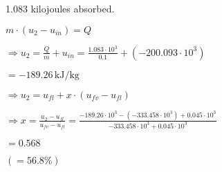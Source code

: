 1.083 kilojoules absorbed.  

\( m \cdot (u_2 - u_{in}) = Q \)  

\( \Rightarrow u_2 = \frac{Q}{m} + u_{in} = \frac{1.083 \cdot 10^3}{0.1} + (-200.093 \cdot 10^3) \)  

\( = -189.26 \, \text{kJ/kg} \)  

\( \Rightarrow u_2 = u_{fl} + x \cdot (u_{fv} - u_{fl}) \)  

\( \Rightarrow x = \frac{u_2 - u_{fl}}{u_{fv} - u_{fl}} = \frac{-189.26 \cdot 10^3 - (-333.458 \cdot 10^3) + 0.045 \cdot 10^3}{-333.458 \cdot 10^3 + 0.045 \cdot 10^3} \)  

\( = 0.568 \)  

\( (= 56.8\% ) \)